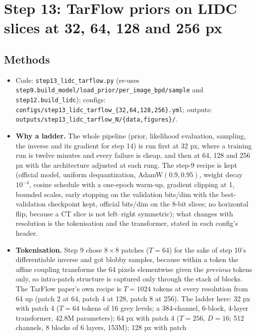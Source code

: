 \documentclass[11pt]{article}
\begin{document}
\section{Step 13: TarFlow priors on LIDC slices at 32, 64, 128 and 256 px}
\label{sec:step13}

\subsection{Methods}
\begin{itemize}
  \item Code: \texttt{step13\_lidc\_tarflow.py} (re-uses
        \texttt{step9.build\_model/load\_prior/per\_image\_bpd/sample} and
        \texttt{step12.build\_lidc}); configs:
        \texttt{configs/step13\_lidc\_tarflow\_\{32,64,128,256\}.yml};
        outputs: \texttt{outputs/step13\_lidc\_tarflow\_N/\{data,figures\}/}.
  \item \textbf{Why a ladder.} The whole pipeline (prior, likelihood
        evaluation, sampling, the inverse and its gradient for step 14) is
        run first at 32 px, where a training run is twelve minutes and every
        failure is cheap, and then at 64, 128 and 256 px with the
        architecture adjusted at each rung. The step-9 recipe is kept
        (official model, uniform dequantization, AdamW$(0.9,0.95)$, weight
        decay $10^{-4}$, cosine schedule with a one-epoch warm-up, gradient
        clipping at 1, bounded scales, early stopping on the validation
        bits/dim with the best-validation checkpoint kept, official bits/dim
        on the 8-bit slices; no horizontal flip, because a CT slice is not
        left--right symmetric); what changes with resolution is the
        tokenisation and the transformer, stated in each config's header.
  \item \textbf{Tokenisation.} Step 9 chose $8 \times 8$ patches ($T =
        64$) for the sake of step 10's differentiable inverse and got
        blobby samples, because within a token the affine coupling
        transforms the 64 pixels elementwise given the \emph{previous}
        tokens only, so intra-patch structure is captured only through the
        stack of blocks. The TarFlow paper's own recipe is $T = 1024$
        tokens at every resolution from 64 up (patch 2 at 64, patch 4 at
        128, patch 8 at 256). The ladder here: 32 px with patch 4 ($T = 64$
        tokens of 16 grey levels; a 384-channel, 6-block, 4-layer
        transformer, 42.8M parameters); 64 px with patch 4 ($T = 256$, $D =
        16$; 512 channels, 8 blocks of 6 layers, 153M); 128 px with patch

\end{itemize}
\end{document}
